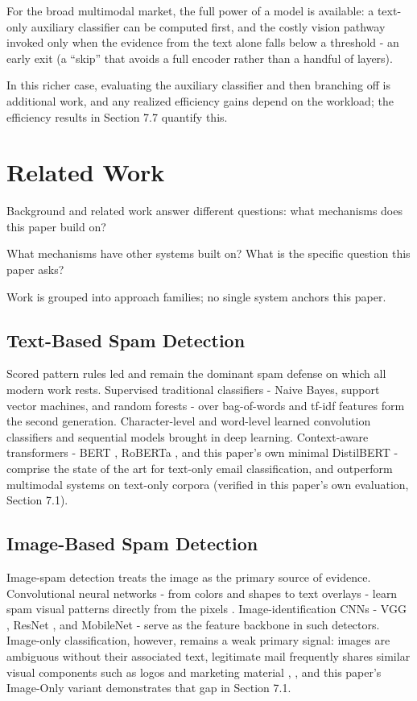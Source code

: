 \documentclass[10pt,twoside]{article}
\begin{document}
For the broad multimodal market, the full power of a model is available: a text-only auxiliary classifier can be computed first, and the costly vision pathway invoked only when the evidence from the text alone falls below a threshold - an early exit (a ``skip'' that avoids a full encoder rather than a handful of layers).

In this richer case, evaluating the auxiliary classifier and then branching off is additional work, and any realized efficiency gains depend on the workload; the efficiency results in Section 7.7 quantify this.

\section{Related Work}\label{sec:3}

Background and related work answer different questions: what mechanisms does this paper build on?

What mechanisms have other systems built on? What is the specific question this paper asks?

Work is grouped into approach families; no single system anchors this paper.

\subsection{Text-Based Spam Detection}\label{sec:3.1}

Scored pattern rules \citep{spamassassin2006} led and remain the dominant spam defense on which all modern work rests. Supervised traditional classifiers - Naive Bayes, support vector machines, and random forests - over bag-of-words and tf-idf features form the second generation. Character-level \citep{zhang2015charcnn} and word-level \citep{kim2014cnn} learned convolution classifiers and sequential models \citep{hochreiter1997lstm} brought in deep learning. Context-aware transformers - BERT \citep{devlin2019bert}, RoBERTa \citep{liu2019roberta}, and this paper's own minimal DistilBERT \citep{sanh2019distilbert} - comprise the state of the art for text-only email classification, and outperform multimodal systems on text-only corpora (verified in this paper's own evaluation, Section 7.1).

\subsection{Image-Based Spam Detection}\label{sec:3.2}

Image-spam detection treats the image as the primary source of evidence. Convolutional neural networks - from colors and shapes to text overlays - learn spam visual patterns directly from the pixels \citep{annadatha2018image}. Image-identification CNNs - VGG \citep{simonyan2015vgg}, ResNet \citep{he2016resnet}, and MobileNet \citep{howard2017mobilenets} - serve as the feature backbone in such detectors. Image-only classification, however, remains a weak primary signal: images are ambiguous without their associated text, legitimate mail frequently shares similar visual components such as logos and marketing material \citep{janez2023review}, \citep{annadatha2018image}, and this paper's Image-Only variant demonstrates that gap in Section 7.1.
\end{document}
